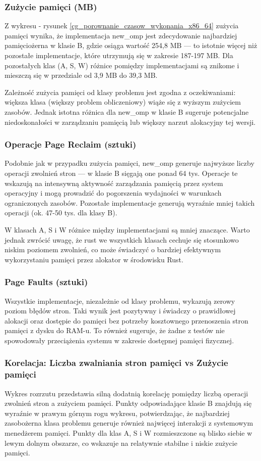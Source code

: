 \subsubsection{Zużycie pamięci (MB)}
Z wykresu - rysunek \ref{cg_porownanie_czasow_wykonania_x86_64} zużycia pamięci wynika, że implementacja new\_omp jest zdecydowanie najbardziej pamięciożerna w klasie B, gdzie osiąga wartość 254,8 MB — to istotnie więcej niż pozostałe implementacje, które utrzymują się w zakresie 187-197 MB. Dla pozostałych klas (A, S, W) różnice pomiędzy implementacjami są znikome i mieszczą się w przedziale od 3,9 MB do 39,3 MB.

Zależność zużycia pamięci od klasy problemu jest zgodna z oczekiwaniami: większa klasa (większy problem obliczeniowy) wiąże się z wyższym zużyciem zasobów. Jednak istotna różnica dla new\_omp w klasie B sugeruje potencjalne niedoskonałości w zarządzaniu pamięcią lub większy narzut alokacyjny tej wersji.

\subsubsection{Operacje Page Reclaim (sztuki)}
Podobnie jak w przypadku zużycia pamięci, new\_omp generuje najwyższe liczby operacji zwolnień stron — w klasie B sięgają one ponad 64 tys. Operacje te wskazują na intensywną aktywność zarządzania pamięcią przez system operacyjny i mogą prowadzić do pogorszenia wydajności w warunkach ograniczonych zasobów. Pozostałe implementacje generują wyraźnie mniej takich operacji (ok. 47-50 tys. dla klasy B).

W klasach A, S i W różnice między implementacjami są mniej znaczące. Warto jednak zwrócić uwagę, że rust we wszystkich klasach cechuje się stosunkowo niskim poziomem zwolnień, co może świadczyć o bardziej efektywnym wykorzystaniu pamięci przez alokator w środowisku Rust.

\subsubsection{Page Faults (sztuki)}
Wszystkie implementacje, niezależnie od klasy problemu, wykazują zerowy poziom błędów stron. Taki wynik jest pozytywny i świadczy o prawidłowej alokacji oraz dostępie do pamięci bez potrzeby kosztownego przenoszenia stron pamięci z dysku do RAM-u. To również sugeruje, że żadne z testów nie spowodowały przeciążenia systemu w zakresie dostępnej pamięci fizycznej.

\subsubsection{Korelacja: Liczba zwalniania stron pamięci vs Zużycie pamięci}
Wykres rozrzutu przedstawia silną dodatnią korelację pomiędzy liczbą operacji zwolnień stron a zużyciem pamięci. Punkty odpowiadające klasie B znajdują się wyraźnie w prawym górnym rogu wykresu, potwierdzając, że najbardziej zasobożerna klasa problemu generuje również najwięcej interakcji z systemowym menedżerem pamięci. Punkty dla klas A, S i W rozmieszczone są blisko siebie w lewym dolnym obszarze, co wskazuje na relatywnie stabilne i niskie zużycie pamięci.


